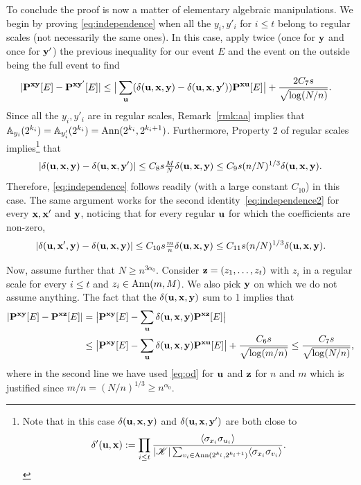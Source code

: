 \documentclass[a4paper,oneside,11pt]{article}
\newcommand{\be}[1]{\begin{equation}\label{#1}}
\newcommand{\ee}{\end{equation}}
\numberwithin{equation}{section}
\numberwithin{equation}{section}
\numberwithin{equation}{section}
\newcommand{\calK}{\mathcal{K}}
\newcommand{\bbA}{\mathbb{A}}
\def\be{\begin{equation}}
\def\ee{\end{equation}}
\begin{document}
To conclude the proof is now a matter of elementary algebraic manipulations. We begin by proving \eqref{eq:independence} when all the $y_i,y'_i$ for $i\le t$ belong to regular scales (not necessarily the same ones). In this case, 
apply twice (once for $\bf y$ and once for $\bf y'$) the previous inequality for our event $E$ and the event on the outside being the full event to find
\begin{align}\label{eq:od}
&|{\bf P}^{{\bf xy}}[E]-{\bf P}^{{\bf xy}'}[E]|\le \big|\sum_{{\bf u}}(\delta({\bf u},{\bf x},{\bf y})-\delta({\bf u},{\bf x},{\bf y}')){\bf P}^{{\bf xu}}[E]\big|+\frac{2C_7s}{\sqrt{\log(N/n)}}.
\end{align}
Since all the $y_i,y'_i$ are in regular scales,   Remark~\ref{rmk:aa} implies that $\bbA_{y_i}(2^{k_i})=\bbA_{y_i'}(2^{k_i})={\rm Ann}(2^{k_i},2^{k_i+1})$. Furthermore, Property 2 of regular scales implies\footnote{Note that in this case $\delta({\bf u},{\bf x},{\bf y})$ and $\delta({\bf u},{\bf x},{\bf y}')$ are both close to 
\[\delta'({\bf u},{\bf x}):=\prod_{i\le t}\frac{\langle\sigma_{x_i}\sigma_{u_i}\rangle}{|\calK|\sum_{v_i\in {\rm Ann}(2^{k_i},2^{k_i+1})}\langle\sigma_{x_i}\sigma_{v_i}\rangle} .\]} that 
\be|\delta({\bf u},{\bf x},{\bf y})-\delta({\bf u},{\bf x},{\bf y}')|\le C_8s\tfrac MN\delta({\bf u},{\bf x},{\bf y})\le C_9s(n/N)^{1/3}\delta({\bf u},{\bf x},{\bf y}).\ee
Therefore, \eqref{eq:independence} follows readily (with a large constant $C_{10}$) in this case. The same argument works for the second identity~\eqref{eq:independence2} for every ${\bf x},{\bf x}'$ and ${\bf y}$, noticing that for every regular ${\bf u}$ for which the coefficients are non-zero,
\be|\delta({\bf u},{\bf x}',{\bf y})-\delta({\bf u},{\bf x},{\bf y})|\le C_{10}s\tfrac mn\delta({\bf u},{\bf x},{\bf y})\le C_{11}s(n/N)^{1/3}\delta({\bf u},{\bf x},{\bf y}).\ee

Now, assume further that $N\ge n^{3\alpha_0}$. Consider ${\bf z}=(z_1,\dots,z_t)$ with $z_i$ in a regular scale for every $i\le t$ and $z_i\in {\rm Ann}(m,M)$. We also pick ${\bf y}$ on which we do not assume anything. The fact that the $\delta({\bf u},{\bf x},{\bf y})$ sum to 1 implies that 
\begin{align}
|{\bf P}^{{\bf xy}}[E]-{\bf P}^{{\bf xz}}[E]|&=\big|{\bf P}^{{\bf xy}}[E]-\sum_{{\bf u}}\delta({\bf u},{\bf x},{\bf y}){\bf P}^{{\bf xz}}[E]\big|\nonumber\\
&\le \big|{\bf P}^{{\bf xy}}[E]-\sum_{{\bf u}}\delta({\bf u},{\bf x},{\bf y}){\bf P}^{{\bf xu}}[E]\big|+\frac{C_6s}{\sqrt{\log(m/n)}}\le \frac{C_7s}{\sqrt{\log(N/n)}},
\end{align}
where in the second line we have used \eqref{eq:od} for ${\bf u}$ and ${\bf z}$ for $n$ and $m$ which is justified since $m/n=(N/n)^{1/3}\ge n^{\alpha_0}$.
\end{document}
